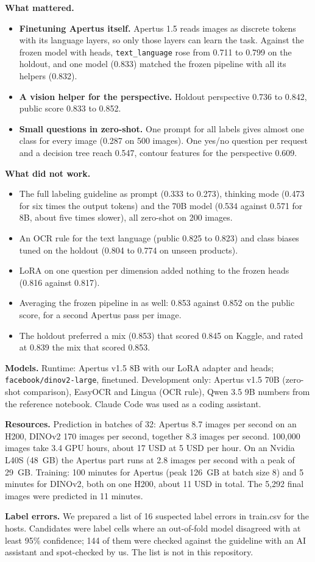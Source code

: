\documentclass[10pt,a4paper]{article}
\newcommand{\code}[1]{\texttt{#1}}
\begin{document}
\textbf{What mattered.}
\begin{itemize}
\item \textbf{Finetuning Apertus itself.} Apertus 1.5 reads images as discrete tokens with its language layers, so
only those layers can learn the task. Against the frozen model with heads, \code{text\_language} rose from 0.711 to
0.799 on the holdout, and one model (0.833) matched the frozen pipeline with all its helpers (0.832).
\item \textbf{A vision helper for the perspective.} Holdout perspective 0.736 to 0.842, public score 0.833 to 0.852.
\item \textbf{Small questions in zero-shot.} One prompt for all labels gives almost one class for every image
(0.287 on 500 images). One yes/no question per request and a decision tree reach 0.547, contour features for the
perspective 0.609.
\end{itemize}

\textbf{What did not work.}
\begin{itemize}
\item The full labeling guideline as prompt (0.333 to 0.273), thinking mode (0.473 for six times the output tokens)
and the 70B model (0.534 against 0.571 for 8B, about five times slower), all zero-shot on 200 images.
\item An OCR rule for the text language (public 0.825 to 0.823) and class biases tuned on the holdout (0.804 to
0.774 on unseen products).
\item LoRA on one question per dimension added nothing to the frozen heads (0.816 against 0.817).
\item Averaging the frozen pipeline in as well: 0.853 against 0.852 on the public score, for a second Apertus pass per image.
\item The holdout preferred a mix (0.853) that scored 0.845 on Kaggle, and rated at 0.839 the mix that scored 0.853.
\end{itemize}

\textbf{Models.} Runtime: Apertus v1.5 8B with our LoRA adapter and heads; \code{facebook/dinov2-large}, finetuned.
Development only: Apertus v1.5 70B (zero-shot comparison), EasyOCR and Lingua (OCR rule), Qwen 3.5 9B numbers
from the reference notebook. Claude Code was used as a coding assistant.

\textbf{Resources.} Prediction in batches of 32: Apertus 8.7 images per second on an H200, DINOv2 170 images per
second, together 8.3 images per second. 100{,}000 images take 3.4 GPU hours, about 17 USD at 5 USD per hour. On an
Nvidia L40S (48~GB) the Apertus part runs at 2.8 images per second with a peak of 29~GB. Training: 100 minutes for
Apertus (peak 126~GB at batch size 8) and 5 minutes for DINOv2, both on one H200, about 11 USD in total. The 5{,}292
final images were predicted in 11 minutes.

\textbf{Label errors.} We prepared a list of 16 suspected label errors in train.csv for the hosts. Candidates were
label cells where an out-of-fold model disagreed with at least 95\% confidence; 144 of them were checked against the
guideline with an AI assistant and spot-checked by us. The list is not in this repository.
\end{document}
